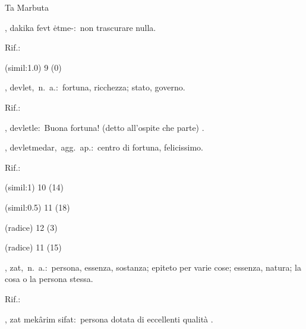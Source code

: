 \begin{glossario}{Ta Marbuta}
\begin{subvocedue}
\end{subvocedue}
\begin{subvocedue}
\item[\subglossariobullet] , {\sf dakika fevt ėtme-}:\ non trascurare nulla.
\begin{subvocedue}
\item[Rif.:] 
\end{subvocedue}
\item[(simil:1.0)]   9 (0)
\end{subvocedue}
\item[{\color{colorlowref}\spzrl{dawlat}},] {\sf devlet},\ n.\ a.:\ fortuna, ricchezza; stato, governo.
\begin{subvocedue}
\item[Rif.:] 
\end{subvocedue}
\begin{subvocedue}
\item[\subglossariobullet] , {\sf devletle}:\ Buona fortuna! (detto all'ospite che parte) \verificare.
\item[\subglossariobullet] , {\sf devletmedar},\ agg.\ ap.:\ centro di fortuna, felicissimo.
\begin{subvocedue}
\item[Rif.:] 
\end{subvocedue}
\item[(simil:1)]   10 (14)
\item[(simil:0.5)]   11 (18)
\item[(radice)]   12 (3)
\item[(radice)]   11 (15)
\end{subvocedue}
\item[{\color{colorlowref}\spzrl{_dAt}},] {\sf zat},\ n.\ a.:\ persona, essenza, sostanza; epiteto per varie cose; essenza, natura; la cosa o la persona stessa.
\begin{subvocedue}
\item[Rif.:] 
\end{subvocedue}
\begin{subvocedue}
\item[\subglossariobullet] , {\sf zat mekârim sifat}:\ persona dotata di eccellenti qualità \verificare[trascrizione].
\begin{subvocedue}

\end{subvocedue}
\end{subvocedue}
\end{glossario}
